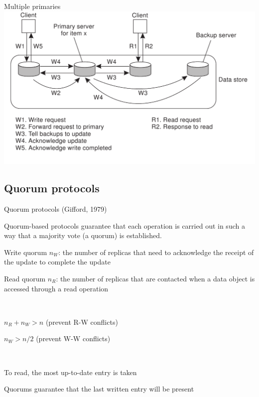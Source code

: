 \begin{frame}{Multiple primaries}
\includegraphics[width=\textwidth]{multipleprimary}
\end{frame}

\subsection{Quorum protocols}

\begin{frame}{Quorum protocols (Gifford, 1979)}
	
\begin{definition}
Quorum-based protocols guarantee that each operation is carried out in such
a way that a majority vote (a quorum) is established.
\BI
\item \alert{Write quorum} $n_W$: the number of replicas that need to acknowledge the receipt of the update to complete the update
\item \alert{Read quorum} $n_R$: the number of replicas that are contacted when a data object is accessed through a read operation
\EI
\end{definition}

\smallskip
{}\\
\BI
\item $n_R + n_W > n$ (prevent R-W conflicts)
\item $n_W > n/2$	  (prevent W-W conflicts)
\EI

\smallskip
{}\\
\BI
\item To read, the most up-to-date entry is taken
\item Quorums guarantee that the last written entry will be present
\EI

\end{frame}

